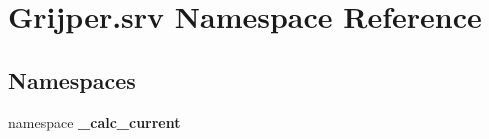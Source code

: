 \section{Grijper.\-srv Namespace Reference}
\label{namespaceGrijper_1_1srv}
\subsection*{Namespaces}
\begin{DoxyCompactItemize}
\item 
namespace {\bf \-\_\-calc\-\_\-current}
\end{DoxyCompactItemize}
